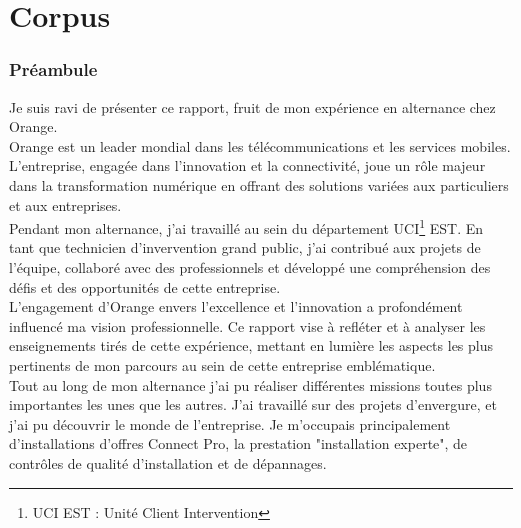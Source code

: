 \documentclass[12pt, a4paper]{article}
\begin{document}
\part{\Large{Corpus}}
\newpage
\pagestyle{fancy}
\section{Préambule}
Je suis ravi de présenter ce rapport, fruit de mon expérience en alternance chez Orange.\\

Orange est un leader mondial dans les télécommunications et les services mobiles.
L'entreprise, engagée dans l'innovation et la connectivité, joue un rôle majeur dans la
transformation numérique en offrant des solutions variées aux particuliers et aux entreprises.\\

Pendant mon alternance, j'ai travaillé au sein du département UCI\footnote{\vspace{-1cm}UCI EST : Unité Client Intervention} EST.
En tant que technicien d'invervention grand public, j'ai contribué aux projets de l'équipe, collaboré avec des
professionnels et développé une compréhension des défis et des opportunités
de cette entreprise.\\

L'engagement d'Orange envers l'excellence et l'innovation a profondément influencé ma vision
professionnelle. Ce rapport vise à refléter et à analyser les enseignements tirés de cette
expérience, mettant en lumière les aspects les plus pertinents de mon parcours au sein de
cette entreprise emblématique.\\

Tout au long de mon alternance j'ai pu réaliser différentes missions
toutes plus importantes les unes que les autres. J'ai travaillé sur des projets
d'envergure, et j'ai pu découvrir le monde de l'entreprise.
Je m'occupais principalement d'installations d'offres
Connect Pro, la prestation "installation experte", 
de contrôles de qualité d'installation et de dépannages.\\
\end{document}
